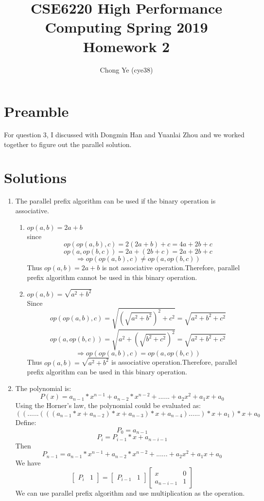 \documentclass[twoside,12pt]{article}
\title{CSE6220 High Performance Computing Spring 2019 \\
	Homework 2}
\author{Chong Ye (cye38)}
\begin{document}
\maketitle

\section{Preamble}
For question 3, I discussed with Dongmin Han and Yuanlai Zhou and we worked together to figure out the parallel solution. 


\section{Solutions}
\begin{enumerate}
\item
The parallel prefix algorithm can be used if the binary operation is associative.
\begin{enumerate}
	\item $ op(a,b)=2a+b $ \\
	since \[ op(op(a,b),c)=2(2a+b)+c=4a+2b+c \]
	\[ op(a,op(b,c))=2a+(2b+c)=2a+2b+c \]
	\[ \Rightarrow op(op(a,b),c) \neq op(a,op(b,c)) \]
	Thus $ op(a,b)=2a+b $ is not associative operation.Therefore, parallel prefix algorithm cannot be used in this binary operation.
	\item $ op(a,b)=\sqrt{a^2+b^2} $\\
	Since
	\[ op(op(a,b),c)=\sqrt{(\sqrt{a^2+b^2})^2+c^2}=\sqrt{a^2+b^2+c^2} \]
	\[ op(a,op(b,c))=\sqrt{a^2+(\sqrt{b^2+c^2})^2}=\sqrt{a^2+b^2+c^2} \]
	\[ \Rightarrow op(op(a,b),c)= op(a,op(b,c))\]
	Thus $ op(a,b)=\sqrt{a^2+b^2} $ is associative operation.Therefore, parallel prefix algorithm can be used in this binary operation.
\end{enumerate}

\setlength{\parindent}{1em}
\item The polynomial is:
\[ P(x)=a_{n-1}*x^{n-1}+a_{n-2}*x^{n-2}+......+a_2x^2+a_1x+a_0 \]
Using the Horner's law, the polynomial could be evaluated as:
\[ ((......(((a_{n-1}*x+a_{n-2})*x+a_{n-3})*x+a_{n-4})......)*x+a_1)*x+a_0 \]
Define:
\[ P_0=a_{n-1} \]
\[ P_i=P_{i-1}*x+a_{n-i-1} \]
Then
\[ P_{n-1}=a_{n-1}*x^{n-1}+a_{n-2}*x^{n-2}+......+a_2x^2+a_1x+a_0 \]
We have
\[ 
\begin{bmatrix}
P_i &1
\end{bmatrix} 
=
\begin{bmatrix}
P_{i-1} &1
\end{bmatrix}
\begin{bmatrix}
x &0\\
a_{n-i-1} &1
\end{bmatrix}\]
We can use parallel prefix algorithm and use multiplication as the operation.


\end{enumerate}
\end{document}
